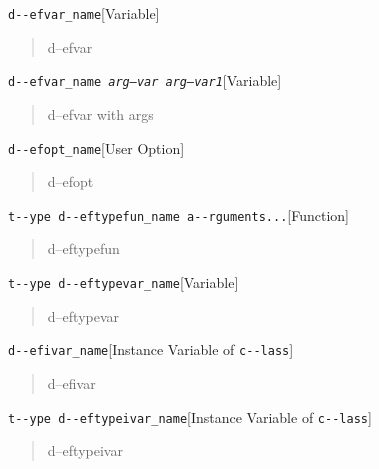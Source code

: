 \documentclass{book}
\begin{document}
\begin{titlepage}
\noindent\texttt{d{-}{-}efvar\_name}\hfill[Variable]



%
\begin{quote}
d--efvar
\end{quote}

\noindent\texttt{d{-}{-}efvar\_name \EmbracOn{}\textnormal{\textsl{arg--var arg--var1}}\EmbracOff{}}\hfill[Variable]



%
\begin{quote}
d--efvar with args
\end{quote}

\noindent\texttt{d{-}{-}efopt\_name}\hfill[User Option]



%
\begin{quote}
d--efopt
\end{quote}

\noindent\texttt{t{-}{-}ype d{-}{-}eftypefun\_name a{-}{-}rguments...}\hfill[Function]



%
\begin{quote}
d--eftypefun
\end{quote}

\noindent\texttt{t{-}{-}ype d{-}{-}eftypevar\_name}\hfill[Variable]



%
\begin{quote}
d--eftypevar
\end{quote}

\noindent\texttt{d{-}{-}efivar\_name}\hfill[Instance Variable of \texttt{c{-}{-}lass}]



%
\begin{quote}
d--efivar
\end{quote}

\noindent\texttt{t{-}{-}ype d{-}{-}eftypeivar\_name}\hfill[Instance Variable of \texttt{c{-}{-}lass}]



%
\begin{quote}
d--eftypeivar
\end{quote}


\end{titlepage}
\end{document}
